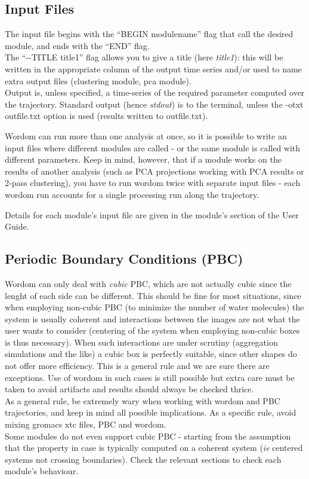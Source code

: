 \documentclass[11pt,twoside,onecolumn,a4paper,openright,notitlepage]{book}[2001/04/21]
\begin{document}
\subsection{Input Files}
The input file begins with the ``BEGIN modulename'' flag that call the desired module, and ends with the ``END'' flag.\\
The ``-{}-TITLE title1'' flag allows you to give a title (here \emph{title1}): this will be written in the appropriate column of the output time series and/or used to name extra output files (clustering module, pca module).\\
Output is, unless specified, a time-series of the required parameter computed over the trajectory. Standard output (hence \emph{stdout}) is to the terminal, unless the -otxt outfile.txt option is used (results written to outfile.txt).

Wordom can run more than one analysis at once, so it is possible to write an input files where different modules are called - or the same module is called with different parameters. Keep in mind, however, that if a module works on the results of another analysis (such as PCA projections working with PCA results or 2-pass clustering), you have to run wordom twice with separate input files - each wordom run accounts for a single processing run along the trajectory.

Details for each module's input file are given in the module's section of the User Guide.

\subsection{Periodic Boundary Conditions (PBC)}
Wordom can only deal with \emph{cubic} PBC, which are not actually cubic since the lenght of each side can be different. This should be fine for most situations, since when employing non-cubic PBC (to minimize the number of water molecules) the system is usually coherent and interactions between the images are not what the user wants to consider (centering of the system when employing non-cubic boxes is thus necessary). When such interactions are under scrutiny (aggregation simulations and the like) a cubic box is perfectly suitable, since other shapes do not offer more efficiency. This is a general rule and we are sure there are exceptions. Use of wordom in such cases is still possible but extra care must be taken to avoid artifacts and results should always be checked thrice.\\
As a general rule, be extremely wary when working with wordom and PBC trajectories, and keep in mind all possible implications. As a specific rule, avoid mixing gromacs xtc files, PBC and wordom.\\
Some modules do not even support cubic PBC - starting from the assumption that the property in case is typically computed on a coherent system (\emph{ie} centered systems not crossing boundaries). Check the relevant sections to check each module's behaviour.
\end{document}
